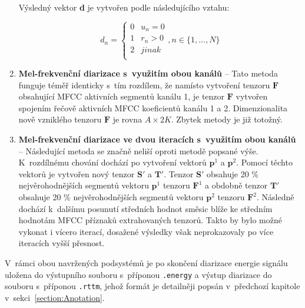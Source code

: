 \begin{enumerate}
    Výsledný vektor \textbf{d} je vytvořen podle následujícího vztahu:
    
    \begin{equation}
    \label{eqn:DIAR_MFCC_1_channel}
        d_{n} = \begin{cases}
            0               & u_{n} = 0\\
            1          & r_{n} > 0\\
            2          & jinak\\
                \end{cases}, n \in \{1,\dots, N\}
    \end{equation}
    
    
    \item \textbf{Mel-frekvenční diarizace s~využitím obou kanálů} -- Tato metoda funguje téměř identicky s~tím rozdílem, že namísto vytvoření tenzoru $\mathbf{F}$ obsahující MFCC aktivních segmentů kanálu 1, je tenzor $\mathbf{F}$ vytvořen spojením řečově aktivních MFCC koeficientů kanálu 1 a 2. Dimenzionalita nově vzniklého tenzoru $\mathbf{F}$ je rovna $A \times 2K$. Zbytek metody je již totožný.
    
    \item \textbf{Mel-frekvenční diarizace ve dvou iteracích s~využitím obou kanálů} -- Následující metoda se značně neliší oproti metodě popsané výše. K~rozdílnému chování dochází po vytvoření vektorů $\mathbf{p}^{1}$ a $\mathbf{p}^{2}$. Pomocí těchto vektorů je vytvořen nový tenzor $\mathbf{S'}$ a $\mathbf{T'}$. Tenzor $\mathbf{S'}$ obsahuje 20 \% nejvěrohodnějších segmentů vektoru $\mathbf{p}^{1}$ tenzoru $\mathbf{F}^{1}$ a obdobně tenzor $\mathbf{T'}$ obsahuje 20 \% nejvěrohodnějších segmentů vektoru $\mathbf{p}^{2}$ tenzoru $\mathbf{F}^{2}$. Následně dochází k~dalšímu posunutí středních hodnot směsic blíže ke středním hodnotám MFCC příznaků extrahovaných tenzorů. Takto by bylo možné vykonat i vícero iterací, dosažené výsledky však neprokazovaly po více iteracích vyšší přesnost.
\end{enumerate}

V~rámci obou navržených podsystémů je po skončení diarizace energie signálu uložena do výstupního souboru s~příponou \texttt{.energy} a výstup diarizace  do souboru s~příponou \texttt{.rttm}, jehož formát je detailněji popsán v~předchozí kapitole v~sekci~\ref{section:Anotation}. 

